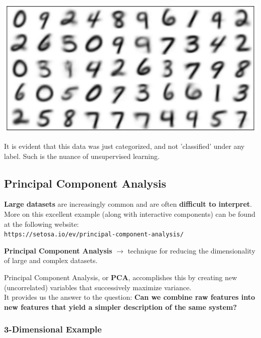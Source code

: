 \documentclass[english, 10pt]{article}
\begin{document}
{
\centering

\includegraphics[scale=0.25]{img/mnistk50.png}

}

\hfill \break It is evident that this data was just categorized, and not 'classified' under any label. Such is the nuance of unsupervised learning.\\

\subsection{Principal Component Analysis}

\textbf{Large datasets} are increasingly common and are often \textbf{difficult to interpret}. More on this excellent example (along with interactive components) can be found at the following website:\\

\texttt{https://setosa.io/ev/principal-component-analysis/}

\hfill \begin{tcolorbox}[title=Definition:,colframe=red!75!black,colback=red!5!white,arc=0pt,fonttitle=\bfseries]
\textbf{Principal Component Analysis} $\rightarrow$ technique for reducing the dimensionality of large and complex datasets.
\end{tcolorbox}

Principal Component Analysis, or \textbf{PCA}, accomplishes this by creating new (uncorrelated) variables that successively maximize variance.\\

It provides us the answer to the question: \textbf{Can we combine raw features into new features that yield a simpler description of the same system?}

\subsubsection{3-Dimensional Example}
\end{document}
